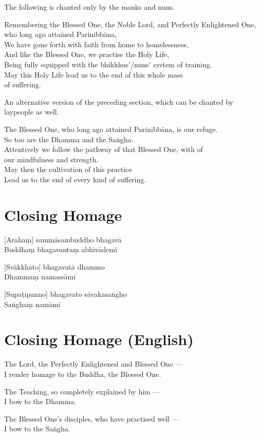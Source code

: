 \begin{instruction}
  The following is chanted only by the monks and nuns.
\end{instruction}

Remembering the Blessed One, the Noble Lord, and Perfectly Enlightened One, who long ago attained Parinibbāna,\\
We have gone forth with faith from home to homelessness,\\
And like the Blessed One, we practise the Holy Life,\\
Being fully equipped with the bhikkhus'/nuns' system of training.\\
May this Holy Life lead us to the end of this whole mass\\ of suffering.\\

\begin{instruction}
  An alternative version of the preceding section, which can be chanted by laypeople as well.
\end{instruction}

The Blessed One, who long ago attained Parinibbāna, is our refuge.\\
So too are the Dhamma and the Saṅgha.\\
Attentively we follow the pathway of that Blessed One, with  of \\our mindfulness and strength.\\
May then the cultivation of this practice\\
Lead us to the end of every kind of suffering.

\section*{Closing Homage}

[Arahaṃ] sammāsambuddho bhagavā\\
Buddhaṃ bhagavantaṃ abhivādemi

[Svākkhāto] bhagavatā dhammo\\
Dhammaṃ namassāmi

[Supaṭipanno] bhagavato sāvakasaṅgho\\
Saṅghaṃ namāmi

\section*{Closing Homage (English)}

The Lord, the Perfectly Enlightened and Blessed One ---\\
I render homage to the Buddha, the Blessed One.

The Teaching, so completely explained by him ---\\
I bow to the Dhamma.

The Blessed One's disciples, who have practised well ---\\
I bow to the Saṅgha.

